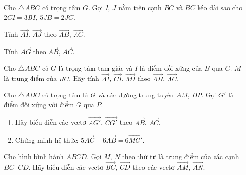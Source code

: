 \begin{bt}%
	Cho $\triangle ABC$ có trọng tâm $G$. Gọi $I$, $J$ nằm trên cạnh $BC$ và $BC$ kéo dài sao cho $2CI=3BI$, $5JB=2JC$.
	\begin{enumEX}{2}
		\item Tính $\overrightarrow{AI}$, $\overrightarrow{AJ}$ theo $\overrightarrow{AB}$, $\overrightarrow{AC}$.
		\item Tính $\overrightarrow{AG}$ theo $\overrightarrow{AB}$, $\overrightarrow{AC}$.
	\end{enumEX}
\end{bt}

\begin{bt}%
	Cho $\triangle ABC$ có $G$ là trọng tâm tam giác và $I$ là điểm đối xứng của $B$ qua $G$. $M$ là trung điểm của $BC$. Hãy tính $\overrightarrow{AI}$, $\overrightarrow{CI}$, $\overrightarrow{MI}$ theo $\overrightarrow{AB}$, $\overrightarrow{AC}$.
\end{bt}

\begin{bt}%
	Cho $\triangle ABC$ có trọng tâm là $G$ và các đường trung tuyến $AM$, $BP$. Gọi $G'$ là điểm đối xứng với điểm $G$ qua $P$.
	\begin{enumerate}
		\item Hãy biểu diễn các vectơ $\overrightarrow{AG'}$, $\overrightarrow{CG'}$ theo $\overrightarrow{AB}$, $\overrightarrow{AC}$.
		\item Chứng minh hệ thức: $5\overrightarrow{AC}-6\overrightarrow{AB}=6\overrightarrow{MG'}$.
	\end{enumerate}
\end{bt}

\begin{bt}%
	Cho hình bình hành $ABCD$. Gọi $M$, $N$ theo thứ tự là trung điểm của các cạnh $BC$, $CD$. Hãy biểu diễn các vectơ $\overrightarrow{BC}$, $\overrightarrow{CD}$ theo các vectơ $\overrightarrow{AM}$, $\overrightarrow{AN}$.
\end{bt}

